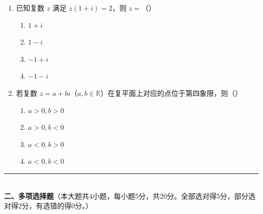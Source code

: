 \documentclass[12pt, a4paper]{ctexart}
\begin{document}
\begin{enumerate}
\item 已知复数 $z$ 满足 $z(1+i)=2$，则 $z=$（\quad）
  \begin{enumerate}[label=\Alph*., itemsep=0pt]
    \item $1+i$ \quad \item $1-i$ \quad \item $-1+i$ \quad \item $-1-i$
  \end{enumerate}

\item 若复数 $z=a+bi$（$a,b\in\mathbb{R}$）在复平面上对应的点位于第四象限，则（\quad）
  \begin{enumerate}[label=\Alph*., itemsep=0pt]
    \item $a>0,b>0$ \quad \item $a>0,b<0$ \quad \item $a<0,b>0$ \quad \item $a<0,b<0$
  \end{enumerate}
\end{enumerate}

\vspace{6pt}

\noindent\rule{\textwidth}{0.4pt}\\[2pt]
{\large\bfseries 二、多项选择题}（本大题共4小题，每小题5分，共20分。全部选对得5分，部分选对得2分，有选错的得0分。）

\vspace{6pt}
\end{document}
